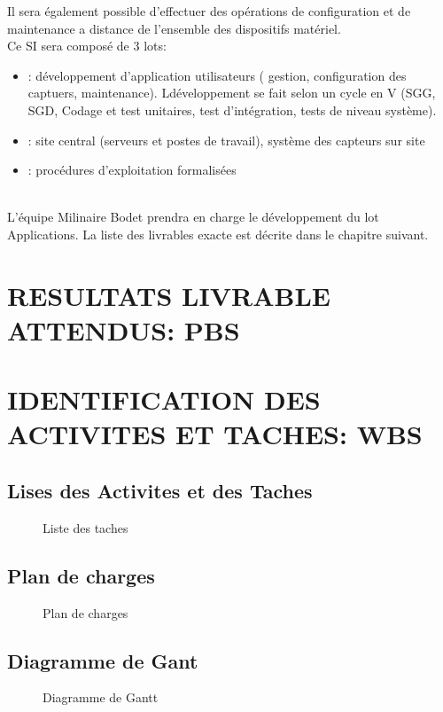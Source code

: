 \documentclass[]{scrartcl}
\begin{document}
Il sera également possible d'effectuer des opérations de configuration et de maintenance a distance de l'ensemble des dispositifs matériel.\\

Ce SI sera composé de 3 lots:
\begin{itemize}
\item {}: développement d'application utilisateurs ( gestion, configuration des captuers, maintenance). Ldéveloppement se fait selon un cycle en V (SGG, SGD, Codage et test unitaires, test d'intégration, tests de niveau système). 
\item {}: site central (serveurs et postes de travail), système des capteurs sur site
\item {}: procédures d'exploitation formalisées
\end{itemize}
\ \\
L'équipe Milinaire Bodet prendra en charge le développement du lot Applications. La liste des livrables exacte est décrite dans le chapitre suivant. 
\newpage
\section{RESULTATS LIVRABLE ATTENDUS: PBS}

\section{IDENTIFICATION DES ACTIVITES ET TACHES: WBS}
\subsection{Lises des Activites et des Taches}
\begin{center}
\begin{figure}[H]
\caption{Liste des taches}
\end{figure}
\end{center}
\subsection{Plan de charges}
\begin{center}
\begin{figure}[H]
\caption{Plan de charges}
\end{figure}
\end{center}
\subsection{Diagramme de Gant}
\begin{figure}[H]
\caption{Diagramme de Gantt}
\end{figure}
\end{document}
